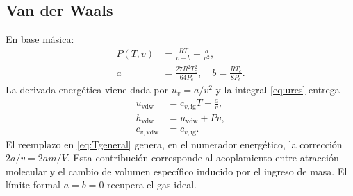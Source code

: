 \documentclass[11pt,letterpaper]{article}
\begin{document}
\subsection{Van der Waals}
En base másica:
\begin{equation}\begin{aligned}
P(T,v)&=\frac{RT}{v-b}-\frac{a}{v^2},\\
a&=\frac{27R^2T_c^2}{64P_c},\quad
b=\frac{RT_c}{8P_c}.
\end{aligned}\label{eq:vdw}\end{equation}
La derivada energética viene dada por $u_v=a/v^2$ y la integral \eqref{eq:ures} entrega
\begin{equation}\begin{aligned}
u_{\mathrm{vdw}}&=c_{v,\mathrm{ig}}T-\frac{a}{v},\\
h_{\mathrm{vdw}}&=u_{\mathrm{vdw}}+Pv,\\
c_{v,\mathrm{vdw}}&=c_{v,\mathrm{ig}}.
\end{aligned}\label{eq:uvdw}\end{equation}
El reemplazo en \eqref{eq:Tgeneral} genera, en el numerador energético, la corrección $2a/v=2am/V$. Esta contribución corresponde al acoplamiento entre atracción molecular y el cambio de volumen específico inducido por el ingreso de masa. El límite formal $a=b=0$ recupera el gas ideal.
\end{document}
